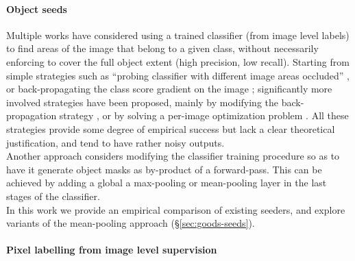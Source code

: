 \documentclass[british,10pt,twocolumn,letterpaper]{article}
\begin{document}
\paragraph{Object seeds}

Multiple works have considered using a trained classifier (from image
level labels) to find areas of the image that belong to a given class,
without necessarily enforcing to cover the full object extent (high
precision, low recall). Starting from simple strategies such as ``probing
classifier with different image areas occluded'' \cite{Zeiler2014Eccv},
or back-propagating the class score gradient on the image \cite{Simonyan2014Iclr};
significantly more involved strategies have been proposed, mainly
by modifying the back-propagation strategy \cite{Springenberg2015Iclrw,Zhang2016Eccv,Shimoda2016Eccv},
or by solving a per-image optimization problem \cite{Cao2015Iccv}.
All these strategies provide some degree of empirical success but
lack a clear theoretical justification, and tend to have rather noisy
outputs.\\
Another approach considers modifying the classifier training procedure
so as to have it generate object masks as by-product of a forward-pass.
This can be achieved by adding a global a max-pooling \cite{Pinheiro2015Cvpr}
or mean-pooling layer \cite{zhou2015cnnlocalization} in the last
stages of the classifier.\\
In this work we provide an empirical comparison of existing seeders,
and explore variants of the mean-pooling approach \cite{zhou2015cnnlocalization}
(\S \ref{sec:goods-seeds}).

\paragraph{Pixel labelling from image level supervision}
\end{document}
